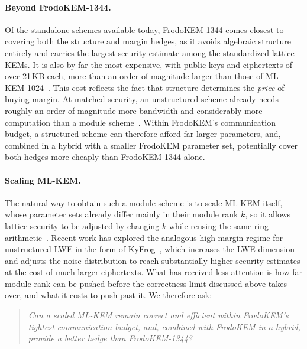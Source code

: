 \paragraph{Beyond FrodoKEM-1344.}Of the standalone schemes available today, FrodoKEM-1344 comes closest to covering both the structure and margin hedges, as it avoids algebraic
structure entirely and carries the largest security estimate among the standardized lattice KEMs. It is also by far the most expensive, with public
keys and ciphertexts of over 21\,KB each, more than an order of magnitude larger than those of ML-KEM-1024~\cite{takeofffrodo,fips203}.
This cost reflects the fact that structure determines the \emph{price} of buying margin. At matched security, an unstructured scheme already
needs roughly an order of magnitude more bandwidth and considerably more computation than a module scheme~\cite{takeofffrodo,kyberoriginal}.
Within FrodoKEM's communication budget, a structured scheme can therefore afford far larger parameters, and, combined in a hybrid with a
smaller FrodoKEM parameter set, potentially cover both hedges more cheaply than FrodoKEM-1344 alone.

\paragraph{Scaling ML-KEM.}The natural way to obtain such a module scheme is to scale ML-KEM itself, whose parameter sets already
differ mainly in their module rank $k$, so it allows lattice security to be adjusted by changing $k$
while reusing the same ring arithmetic~\cite{kyberoriginal}. Recent work has explored the analogous high-margin regime for unstructured LWE in the form of KyFrog~\cite{kyfrog}, which increases
the LWE dimension and adjusts the noise distribution to reach substantially higher security estimates at the cost of much larger
ciphertexts. What has received less attention is how far module rank can be pushed before the correctness limit discussed above
takes over, and what it costs to push past it. We therefore ask:
\begin{quote}
\emph{Can a scaled ML-KEM remain correct and efficient within FrodoKEM's tightest communication budget, and, combined with FrodoKEM in a hybrid,
provide a better hedge than FrodoKEM-1344?}
\end{quote}

